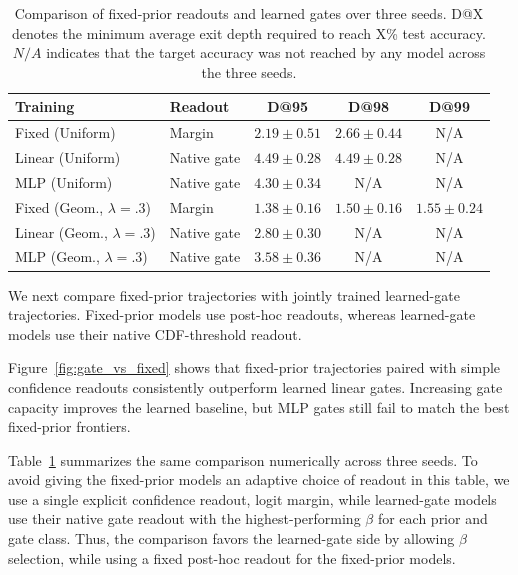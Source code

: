 \documentclass[10pt]{article} %
\renewcommand{\arraystretch}{0.9}
\begin{document}
\begin{table}[t]
\centering
\scriptsize
\setlength{\tabcolsep}{4pt}
\renewcommand{\arraystretch}{0.95}
\caption{
Comparison of fixed-prior readouts and learned gates over three seeds.
D@X denotes the minimum average exit depth required to reach X\% test accuracy. $N/A$ indicates that the target accuracy was not reached by any model across the three seeds.
}
\label{tab:fixed_vs_gate_multiseed_summary}

\begin{tabular}{llccc}
\toprule
Training & Readout & D@95 & D@98 & D@99 \\
\midrule
Fixed (Uniform)
    & Margin      & $2.19\pm0.51$ & $2.66\pm0.44$ & N/A \\
Linear (Uniform)
    & Native gate & $4.49\pm0.28$ & $4.49\pm0.28$ & N/A \\
MLP (Uniform)
    & Native gate & $4.30\pm0.34$ & N/A & N/A \\
\midrule
Fixed (Geom., $\lambda=.3$)
    & Margin      & $1.38\pm0.16$ & $1.50\pm0.16$ & $1.55\pm0.24$ \\
Linear (Geom., $\lambda=.3$)
    & Native gate & $2.80\pm0.30$ & N/A & N/A \\
MLP (Geom., $\lambda=.3$)
    & Native gate & $3.58\pm0.36$ & N/A & N/A \\
\bottomrule
\end{tabular}
\end{table}

We next compare fixed-prior trajectories with jointly trained learned-gate trajectories. Fixed-prior models use post-hoc readouts, whereas learned-gate models use their native CDF-threshold readout.

Figure~\ref{fig:gate_vs_fixed} shows that fixed-prior trajectories paired with simple confidence readouts consistently outperform learned linear gates. Increasing gate capacity improves the learned baseline, but MLP gates still fail to match the best fixed-prior frontiers.

Table~\ref{tab:fixed_vs_gate_multiseed_summary} summarizes the same comparison numerically across three seeds. To avoid giving the fixed-prior models an adaptive choice of readout in this table, we use a single explicit confidence readout, logit margin, while learned-gate models use their native gate readout with the highest-performing \(\beta\) for each prior and gate class. Thus, the comparison favors the learned-gate side by allowing \(\beta\) selection, while using a fixed post-hoc readout for the fixed-prior models.
\end{document}
